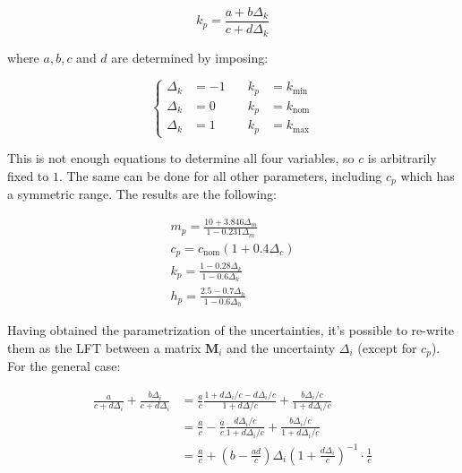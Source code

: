 \documentclass{scrreprt}
\begin{document}
\begin{equation}
    k_p = \frac{a+b\Delta_k}{c+d\Delta_k}
\end{equation}

where $a, b, c$ and $d$ are determined by imposing:

\begin{equation}
    \left\{
    \begin{aligned}
    \Delta_k &= -1 & \quad k_p &= k_{\text{min}} \\
    \Delta_k &= 0  & \quad k_p &= k_{\text{nom}} \\
    \Delta_k &= 1  & \quad k_p &= k_{\text{max}}
    \end{aligned}
    \right.
\end{equation}

This is not enough equations to determine all four variables, so $c$ is arbitrarily fixed to $1$. The same can be done for all other parameters, including $c_p$ which has a symmetric range. The results are the following:

\begin{equation}
    \begin{aligned}
        m_p = \frac{10+3.846\Delta_m}{1-0.231\Delta_m}\\
        c_p = c_{\text{nom}}(1+0.4\Delta_c)\\
        k_p=\frac{1-0.28\Delta_k}{1-0.6\Delta_k}\\
        h_p=\frac{2.5-0.7\Delta_h}{1-0.6\Delta_h}
    \end{aligned}
\end{equation}

Having obtained the parametrization of the uncertainties, it's possible to re-write them as the LFT between a matrix $\boldsymbol{M}_i$ and the uncertainty $\Delta_i$ (except for $c_p$). For the general case:

\begin{equation}
\begin{aligned}
\frac{a}{c + d\Delta_i} + \frac{b\Delta_i}{c + d\Delta_i} 
&= \frac{a}{c} \frac{1 + d\Delta_i/c - d\Delta_i/c}{1 + d\Delta/c} + \frac{b\Delta_i/c}{1 + d\Delta_i/c} \\
&= \frac{a}{c} - \frac{a}{c} \frac{d\Delta_i/c}{1 + d\Delta_i/c} + \frac{b\Delta_i/c}{1 + d\Delta_i/c} \\
&= \frac{a}{c} + \left( b - \frac{ad}{c} \right) \Delta_i \left( 1 + \frac{d\Delta_i}{c} \right)^{-1} \cdot \frac{1}{c}
\end{aligned}
\end{equation}
\end{document}
